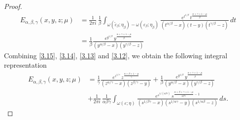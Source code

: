 \documentclass[10pt,a4paper]{amsart}
\begin{document}
\begin{proof}
\begin{equation}
\begin{aligned}
E_{\alpha,\beta,\gamma}(x,y,z;\mu)
&=
\frac{1}{2\pi i}\,
\frac{1}{\beta}
\int_{\omega(\widetilde{\varepsilon}_{\beta};\eta_\beta)-\omega(\varepsilon_{\beta};\eta_\beta)}
\frac{
e^{t^{1/\beta}}
\,t^{\frac{\alpha+\gamma+1-\mu}{\beta}}
}
{
(t^{\alpha/\beta}-x)(t-y)(t^{\gamma/\beta}-z)
}
\,dt\\
&=\frac{1}{\beta}\frac{
e^{y^{1/\beta}}
\,y^{\frac{\alpha+\gamma+1-\mu}{\beta}}}
{(y^{\alpha/\beta}-x)(y^{\gamma/\beta}-z)}\end{aligned}
\end{equation}
Combining  \eqref{3.15}, \eqref{3.14}, \eqref{3.13} and \eqref{3.12}, we obtain the following integral representation 
\begin{equation}\label{3.16}\begin{aligned}
E_{\alpha,\beta,\gamma}(x,y,z;\mu)
&=\frac{1}{\gamma}\frac{
e^{z^{1/\gamma}}
\,z^{\frac{\alpha+\beta+1-\mu}{\gamma}}}
{(z^{\alpha/\gamma}-x)(z^{\beta/\gamma}-y)}+\frac{1}{\beta}\frac{
e^{y^{1/\beta}}
\,y^{\frac{\alpha+\gamma+1-\mu}{\beta}}}
{(y^{\alpha/\beta}-x)(y^{\gamma/\beta}-z)}\\
&+
\frac{1}{2\pi i}\,
\frac{1}{\alpha\beta\gamma}
\int_{\omega(\varepsilon;\eta)}
\frac{
e^{s^{1/(\alpha\beta\gamma)}}
\,s^{\frac{\alpha+\beta+\gamma+1-\mu}{\alpha\beta\gamma}-1}
}
{
(s^{1/\beta\gamma}-x)(s^{1/\alpha\gamma}-y)(s^{1/\alpha\beta}-z)
}
\,ds.\end{aligned}\end{equation}


\end{proof}
\end{document}
